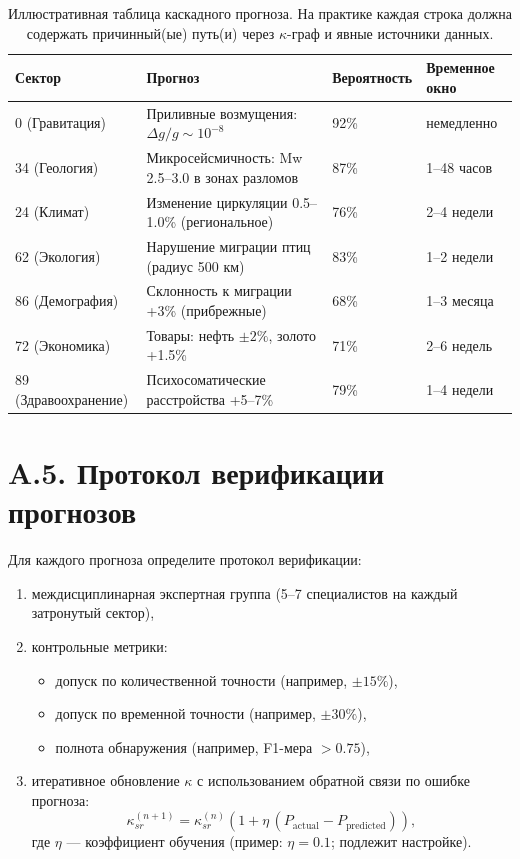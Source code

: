 \documentclass[11pt,a4paper]{article}
\begin{document}
	\begin{table}[htbp]
		\centering
		\small
		\begin{tabular}{p{}p{}p{}p{}}
			\toprule
			\textbf{Сектор} & \textbf{Прогноз} & \textbf{Вероятность} & \textbf{Временное окно} \\
			\midrule
			0 (Гравитация) & Приливные возмущения: $\Delta g/g \sim 10^{-8}$ & 92\% & немедленно \\
			34 (Геология) & Микросейсмичность: Mw 2.5--3.0 в зонах разломов & 87\% & 1--48 часов \\
			24 (Климат) & Изменение циркуляции 0.5--1.0\% (региональное) & 76\% & 2--4 недели \\
			62 (Экология) & Нарушение миграции птиц (радиус 500 км) & 83\% & 1--2 недели \\
			86 (Демография) & Склонность к миграции +3\% (прибрежные) & 68\% & 1--3 месяца \\
			72 (Экономика) & Товары: нефть $\pm 2\%$, золото +1.5\% & 71\% & 2--6 недель \\
			89 (Здравоохранение) & Психосоматические расстройства +5--7\% & 79\% & 1--4 недели \\
			\bottomrule
		\end{tabular}
		\caption{Иллюстративная таблица каскадного прогноза. На практике каждая строка должна содержать причинный(ые) путь(и) через $\kappa$-граф и явные источники данных.}
	\end{table}
	
	\section*{A.5. Протокол верификации прогнозов}
	
	Для каждого прогноза определите протокол верификации:
	\begin{enumerate}[leftmargin=*]
		\item междисциплинарная экспертная группа (5–7 специалистов на каждый затронутый сектор),
		\item контрольные метрики:
		\begin{itemize}[leftmargin=*]
			\item допуск по количественной точности (например, $\pm 15\%$),
			\item допуск по временной точности (например, $\pm 30\%$),
			\item полнота обнаружения (например, F1-мера $>0.75$),
		\end{itemize}
		\item итеративное обновление $\kappa$ с использованием обратной связи по ошибке прогноза:
		\[
		\kappa_{sr}^{(n+1)}=\kappa_{sr}^{(n)}\left(1+\eta\,(P_{\mathrm{actual}}-P_{\mathrm{predicted}})\right),
		\]
		где $\eta$ — коэффициент обучения (пример: $\eta=0.1$; подлежит настройке).
	\end{enumerate}
	
\end{document}
